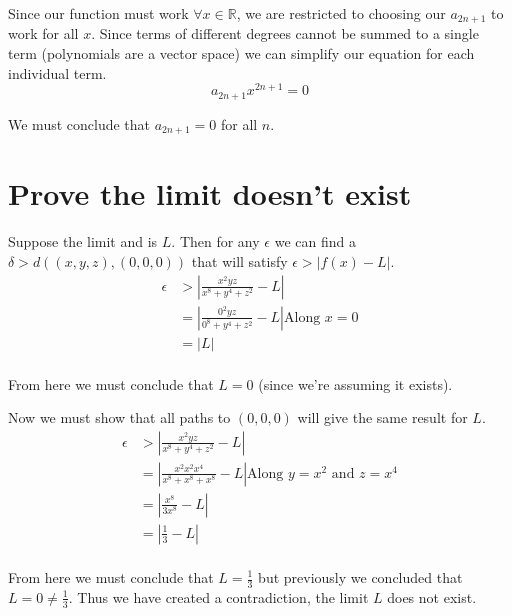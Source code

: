 \documentclass{article}
\begin{document}
Since our function must work $\forall x \in \mathbb{R}$, we are restricted to
choosing our $a_{2n+1}$ to work for all $x$. Since terms of different degrees
cannot be summed to a single term (polynomials are a vector space) we can
simplify our equation for each individual term.
\[
    a_{2n+1} x^{2n+1} = 0
\]

We must conclude that $a_{2n+1} = 0$ for all $n$.

\section{Prove the limit doesn't exist}
Suppose the limit and is $L$. Then for any $\epsilon$ we can find a
$\delta > d((x,y,z), (0,0,0))$ that will satisfy $\epsilon > |f(x) - L|$.
\begin{align*}
    \epsilon &> \left| \frac{x^2 y z}{x^8 + y^4 + z^2} - L \right| \\
    &= \left| \frac{0^2 y z}{0^8 + y^4 + z^2} - L \right| \text{Along $x=0$} \\
    &= \left| L \right| \\
\end{align*}

From here we must conclude that $L = 0$ (since we're assuming it exists).

Now we must show that all paths to $(0,0,0)$ will give the same result for $L$.
\begin{align*}
    \epsilon &> \left| \frac{x^2 y z}{x^8 + y^4 + z^2} - L \right| \\
    &= \left| \frac{x^2 x^2 x^4}{x^8 + x^8 + x^8} - L \right| \text{Along $y=x^2$ and $z=x^4$} \\
    &= \left| \frac{x^8}{3x^8} - L \right| \\
    &= \left| \frac{1}{3} - L \right| \\
\end{align*}

From here we must conclude that $L=\frac{1}{3}$ but previously we concluded
that $L = 0 \neq \frac{1}{3}$. Thus we have created a contradiction, the limit
$L$ does not exist.
\end{document}
